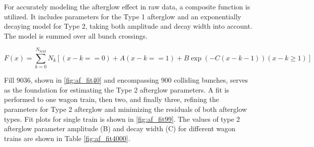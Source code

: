 For accurately modeling the afterglow effect in raw data, a composite function is utilized. It includes parameters for the Type 1 afterglow and an exponentially decaying model for Type 2, taking both amplitude and decay width into account. The model is summed over all bunch crossings.

\begin{equation}
F(x) = \sum_{k=0}^{N_{\text{bcid}}} N_k \left[ (x - k == 0) + A  (x - k == 1) + B  \exp(-C  (x - k - 1))  (x - k \geq 1) \right]
\end{equation}

Fill 9036, shown in \ref{fig:af_fit40} and encompassing 900 colliding bunches, serves as the foundation for estimating the Type 2 afterglow parameters. A fit is performed to one wagon train, then two, and finally three, refining the parameters for Type 2 afterglow and minimizing the residuals of both afterglow types. Fit plots for single train is shown in \ref{fig:af_fit99}. The values of type 2 afterglow parameter amplitude (B) and decay width (C) for different wagon trains are shown in Table \ref{fig:af_fit4000}. 


